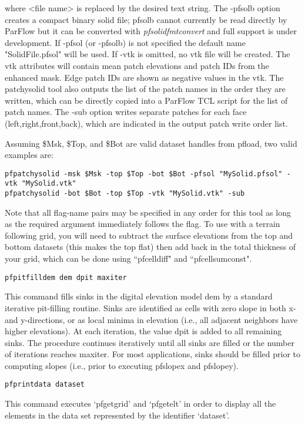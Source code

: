 \begin{description}
where <file name> is replaced by the desired text string. The -pfsolb option creates a compact binary solid file; pfsolb cannot currently be read directly by ParFlow but it can be converted with \textit{pfsolidfmtconvert} and full support is under development. If -pfsol (or -pfsolb) is not specified the
default name "SolidFile.pfsol" will be used. If -vtk is omitted, no vtk file will be created. The vtk attributes will contain mean patch elevations and patch IDs from the enhanced mask. Edge patch IDs are shown as negative values in the vtk.
The patchysolid tool also outputs the list of the patch names in the order they are written, which can be directly copied into a ParFlow TCL script for the list of patch names. The -sub option writes separate patches for each face (left,right,front,back), which are indicated in the output patch write order list.

Assuming \$Msk, \$Top, and \$Bot are valid dataset handles from pfload, two valid examples are:
\begin{display}
\begin{verbatim}
pfpatchysolid -msk $Msk -top $Top -bot $Bot -pfsol "MySolid.pfsol" -vtk "MySolid.vtk"
pfpatchysolid -bot $Bot -top $Top -vtk "MySolid.vtk" -sub
\end{verbatim}
\end{display}
Note that all flag-name pairs may be specified in any order for this tool as long as the required argument immediately follows the flag. To use with a terrain following grid, you will need to subtract the surface elevations from the top and bottom datasets (this makes the top flat) then add back in the total thickness of your grid, which can be done using ``pfcelldiff" and ``pfcellsumconst".


\item{\begin{verbatim}pfpitfilldem dem dpit maxiter \end{verbatim}}
This command fills sinks in the digital elevation model dem by a standard iterative
pit-filling routine. Sinks are identified as cells with zero slope in both x- and
y-directions, or as local minima in elevation (i.e., all adjacent neighbors have
higher elevations). At each iteration, the value dpit is added to all remaining
sinks. The procedure continues iteratively until all sinks are filled or the number
of iterations reaches maxiter. For most applications, sinks should be filled prior
to computing slopes (i.e., prior to executing pfslopex and pfslopey).


\item{\begin{verbatim}pfprintdata dataset\end{verbatim}}
This command executes `pfgetgrid' and `pfgetelt' in order to display
all the elements in the data set represented by the identifier
`dataset'.



\end{description}
